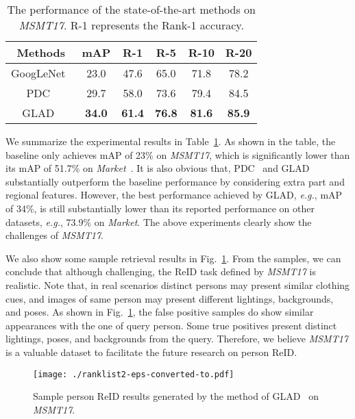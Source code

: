 \documentclass[10pt,twocolumn,letterpaper]{article}
\begin{document}
\captionsetup{belowskip=-0cm}
\captionsetup{aboveskip=0.1cm}
\begin{table}
\footnotesize
\begin{center}
\caption{The performance of the state-of-the-art methods on \emph{MSMT17}. R-1 represents the Rank-1 accuracy.}\label{tab:tab4}
\begin{tabular}{c|c|c|c|c|c}
\hline
{Methods} &mAP&R-1 &R-5 &R-10 &R-20\\
\hline
\hline
GoogLeNet~\cite{szegedy2015going}     &23.0&47.6 &65.0&71.8&78.2\\
\hline
PDC~\cite{su2017pose} 	&29.7&58.0 &73.6 &79.4 &84.5\\
\hline
GLAD~\cite{wei2017glad}      &\textbf{34.0} &\textbf{61.4}&\textbf{76.8}&\textbf{81.6}&\textbf{85.9}\\
\hline
\end{tabular}
\end{center}
\end{table}



We summarize the experimental results in Table~\ref{tab:tab4}. As shown in the table, the baseline only achieves mAP of 23\% on \emph{MSMT17}, which is significantly lower than its mAP of 51.7\% on \emph{Market}~\cite{geng2016deep}. It is also obvious that, PDC~\cite{su2017pose} and GLAD~\cite{wei2017glad} substantially outperform the baseline performance by considering extra part and regional features. However, the best performance achieved by GLAD, \emph{e.g.}, mAP of 34\%, is still substantially lower than its reported performance on other datasets, \emph{e.g.}, 73.9\% on \emph{Market}. The above experiments clearly show the challenges of \emph{MSMT17}.

We also show some sample retrieval results in Fig.~\ref{fig:ranklist}. From the samples, we can conclude that although challenging, the ReID task defined by \emph{MSMT17} is realistic. Note that, in real scenarios distinct persons may present similar clothing cues, and images of same person may present different lightings, backgrounds, and poses. As shown in Fig.~\ref{fig:ranklist}, the false positive samples do show similar appearances with the one of query person. Some true positives present distinct lightings, poses, and backgrounds from the query. Therefore, we believe \emph{MSMT17} is a valuable dataset to facilitate the future research on person ReID.

\begin{figure}
\begin{center}
\texttt{[image: ./ranklist2-eps-converted-to.pdf]}
\end{center}
\caption{Sample person ReID results generated by the method of GLAD~\cite{wei2017glad} on \emph{MSMT17}.}
\label{fig:ranklist}
\end{figure}
\end{document}
